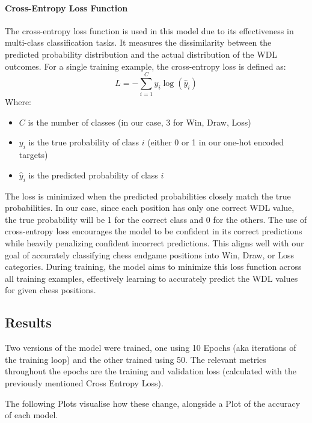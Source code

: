 \paragraph{Cross-Entropy Loss Function}
The cross-entropy loss function is used in this model due to its effectiveness in multi-class classification tasks. It measures the dissimilarity between the predicted probability distribution and the actual distribution of the WDL outcomes.
For a single training example, the cross-entropy loss is defined as:
\[
L = -\sum_{i=1}^{C} y_i \log(\hat{y}_i)
\]
Where:
\begin{itemize}
\item $C$ is the number of classes (in our case, 3 for Win, Draw, Loss)
\item $y_i$ is the true probability of class $i$ (either 0 or 1 in our one-hot encoded targets)
\item $\hat{y}_i$ is the predicted probability of class $i$
\end{itemize}
The loss is minimized when the predicted probabilities closely match the true probabilities. In our case, since each position has only one correct WDL value, the true probability will be 1 for the correct class and 0 for the others.
The use of cross-entropy loss encourages the model to be confident in its correct predictions while heavily penalizing confident incorrect predictions. This aligns well with our goal of accurately classifying chess endgame positions into Win, Draw, or Loss categories.
During training, the model aims to minimize this loss function across all training examples, effectively learning to accurately predict the WDL values for given chess positions.

\subsection{Results}
Two versions of the model were trained, one using 10 Epochs (aka iterations of the training loop) and the other trained using 50. The relevant metrics throughout the epochs are the training and validation loss (calculated with the previously mentioned Cross Entropy Loss).

The following Plots visualise how these change, alongside a Plot of the accuracy of each model.

